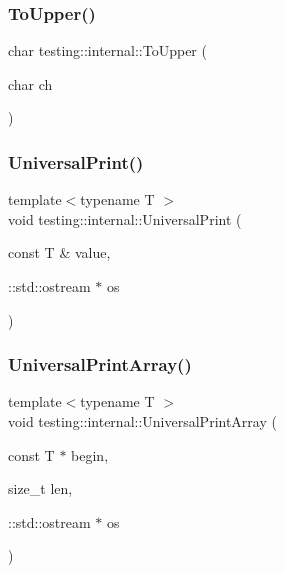 \mbox{\label{namespacetesting_1_1internal_ac1b876a8133895bd553d4780ecaa1e3a}} 
\subsubsection{\texorpdfstring{ToUpper()}{ToUpper()}}
{\footnotesize\ttfamily char testing\+::internal\+::\+To\+Upper (\begin{DoxyParamCaption}\item[{char}]{ch }\end{DoxyParamCaption})\hspace{0.3cm}{\ttfamily [inline]}}

\mbox{\label{namespacetesting_1_1internal_a30708fa2bacf11895b03bdb21eb72309}} 
\subsubsection{\texorpdfstring{UniversalPrint()}{UniversalPrint()}}
{\footnotesize\ttfamily template$<$typename T $>$ \\
void testing\+::internal\+::\+Universal\+Print (\begin{DoxyParamCaption}\item[{const T \&}]{value,  }\item[{\+::std\+::ostream $\ast$}]{os }\end{DoxyParamCaption})}

\mbox{\label{namespacetesting_1_1internal_ad79d71c3110f8eb24ab352d68f29436a}} 
\subsubsection{\texorpdfstring{UniversalPrintArray()}{UniversalPrintArray()}\hspace{0.1cm}{\footnotesize\ttfamily [1/3]}}
{\footnotesize\ttfamily template$<$typename T $>$ \\
void testing\+::internal\+::\+Universal\+Print\+Array (\begin{DoxyParamCaption}\item[{const T $\ast$}]{begin,  }\item[{size\+\_\+t}]{len,  }\item[{\+::std\+::ostream $\ast$}]{os }\end{DoxyParamCaption})}

